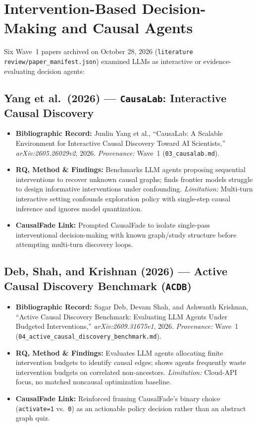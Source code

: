 \section{Intervention-Based Decision-Making and Causal Agents}

Six Wave~1 papers archived on October 28, 2026 (\texttt{literature review/paper\_manifest.json}) examined LLMs as interactive or evidence-evaluating decision agents:

\subsection{Yang et al.\ (2026) --- \texttt{CausaLab}: Interactive Causal Discovery \citep{yang2026causalab}}
\begin{itemize}
  \item \textbf{Bibliographic Record:} Junlin Yang et al., ``CausaLab: A Scalable Environment for Interactive Causal Discovery Toward AI Scientists,'' \emph{arXiv:2605.26029v2}, 2026. \emph{Provenance:} Wave~1 (\texttt{03\_causalab.md}).
  \item \textbf{RQ, Method \& Findings:} Benchmarks LLM agents proposing sequential interventions to recover unknown causal graphs; finds frontier models struggle to design informative interventions under confounding. \emph{Limitation:} Multi-turn interactive setting confounds exploration policy with single-step causal inference and ignores model quantization.
  \item \textbf{CausalFade Link:} Prompted CausalFade to isolate single-pass interventional decision-making with known graph/study structure before attempting multi-turn discovery loops.
\end{itemize}

\subsection{Deb, Shah, and Krishnan (2026) --- Active Causal Discovery Benchmark (\texttt{ACDB}) \citep{deb2026acdb}}
\begin{itemize}
  \item \textbf{Bibliographic Record:} Sagar Deb, Devam Shah, and Ashwanth Krishnan, ``Active Causal Discovery Benchmark: Evaluating LLM Agents Under Budgeted Interventions,'' \emph{arXiv:2609.31675v1}, 2026. \emph{Provenance:} Wave~1 (\texttt{04\_active\_causal\_discovery\_benchmark.md}).
  \item \textbf{RQ, Method \& Findings:} Evaluates LLM agents allocating finite intervention budgets to identify causal edges; shows agents frequently waste intervention budgets on correlated non-ancestors. \emph{Limitation:} Cloud-API focus, no matched noncausal optimization baseline.
  \item \textbf{CausalFade Link:} Reinforced framing CausalFade's binary choice (\texttt{activate=1} vs.\ \texttt{0}) as an actionable policy decision rather than an abstract graph quiz.
\end{itemize}

